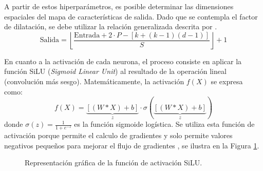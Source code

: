 \documentclass{article}
\begin{document}
	A partir de estos hiperparámetros, es posible determinar las dimensiones espaciales del mapa de características de salida. Dado que se contempla el factor de dilatación, se debe utilizar la relación generalizada descrita por \cite{conv}.
	\begin{equation} 
		\text{Salida} = \left\lfloor \frac{\text{Entrada} + 2 \cdot P - [k + (k-1)(d-1)]}{S} \right\rfloor + 1
	 \end{equation}
	
	En cuanto a la activación de cada neurona, el proceso consiste en aplicar la función SiLU (\textit{Sigmoid Linear Unit}) al resultado de la operación lineal (convolución más sesgo). Matemáticamente, la activación \(f(X)\) se expresa como:
	\begin{equation}
		f(X) = \underbrace{[(W * X) + b]}_{z} \cdot \sigma(\underbrace{[(W * X) + b]}_{z})
	\end{equation}
	\noindent donde \(\sigma(z) = \frac{1}{1+e^{-z}}\) es la función sigmoide logística. Se utiliza esta función de activación porque permite el calculo de gradientes y solo permite valores negativos pequeños para mejorar el flujo de gradientes \cite{silu,silu2}, se ilustra en la Figura \ref{fig:silu_plot}.

	\begin{figure}[H] 
		\centering
		\caption{Representación gráfica de la función de activación SiLU.}
		\label{fig:silu_plot}
	\end{figure}
	
\end{document}

